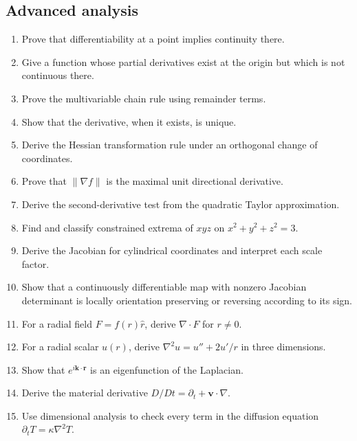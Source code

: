 \subsection{Advanced analysis}
\begin{enumerate}
  \item Prove that differentiability at a point implies continuity there.
  \item Give a function whose partial derivatives exist at the origin but which is not continuous there.
  \item Prove the multivariable chain rule using remainder terms.
  \item Show that the derivative, when it exists, is unique.
  \item Derive the Hessian transformation rule under an orthogonal change of coordinates.
  \item Prove that $\|\nabla f\|$ is the maximal unit directional derivative.
  \item Derive the second-derivative test from the quadratic Taylor approximation.
  \item Find and classify constrained extrema of $xyz$ on $x^2+y^2+z^2=3$.
  \item Derive the Jacobian for cylindrical coordinates and interpret each scale factor.
  \item Show that a continuously differentiable map with nonzero Jacobian determinant is locally orientation preserving or reversing according to its sign.
  \item For a radial field $F=f(r)\hat r$, derive $\nabla\cdot F$ for $r\ne0$.
  \item For a radial scalar $u(r)$, derive $\nabla^2u=u''+2u'/r$ in three dimensions.
  \item Show that $e^{i\mathbf k\cdot\mathbf r}$ is an eigenfunction of the Laplacian.
  \item Derive the material derivative $D/Dt=\partial_t+\mathbf v\cdot\nabla$.
  \item Use dimensional analysis to check every term in the diffusion equation $\partial_tT=\kappa\nabla^2T$.
\end{enumerate}
